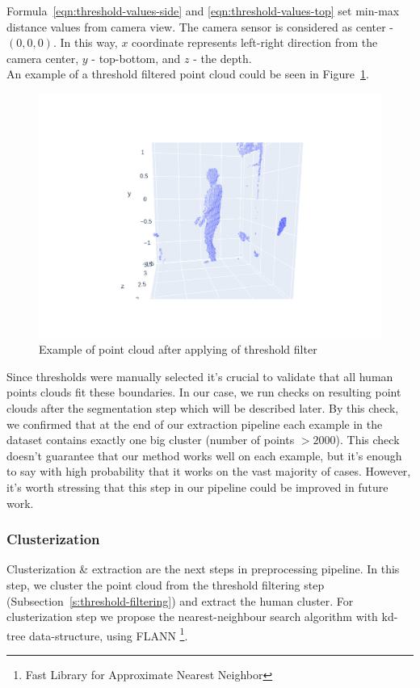 Formula~\ref{eqn:threshold-values-side} and \ref{eqn:threshold-values-top} set min-max distance values from camera view. The camera sensor is considered as center - $(0, 0, 0)$. In this way, $x$ coordinate represents left-right direction from the camera center, $y$ - top-bottom, and $z$ - the depth. \\
An example of a threshold filtered point cloud could be seen in Figure~\ref{img:after-threshold-filtering}.

\begin{figure}[htbp]
    \centerline{
            \includegraphics[trim=750 200 700 200,clip,scale=.35]{Figures/example-after-threshold.png}
    }
    \caption{Example of point cloud after applying of threshold filter}
    \label{img:after-threshold-filtering}
\end{figure}

Since thresholds were manually selected it's crucial to validate that all human points clouds fit these boundaries. In our case, we run checks on resulting point clouds after the segmentation step which will be described later. By this check, we confirmed that at the end of our extraction pipeline each example in the dataset contains exactly one big cluster (number of points $>2000$). This check doesn't guarantee that our method works well on each example, but it's enough to say with high probability that it works on the vast majority of cases. However, it's worth stressing that this step in our pipeline could be improved in future work.

\subsubsection{Clusterization}
Clusterization \& extraction are the next steps in preprocessing pipeline. In this step, we cluster the point cloud from the threshold filtering step (Subsection~\ref{s:threshold-filtering}) and extract the human cluster. For clusterization step we propose the nearest-neighbour search algorithm \parencite{noauthor_nearest_2021} with kd-tree data-structure, using FLANN \footnote{Fast Library for Approximate Nearest Neighbor}.

